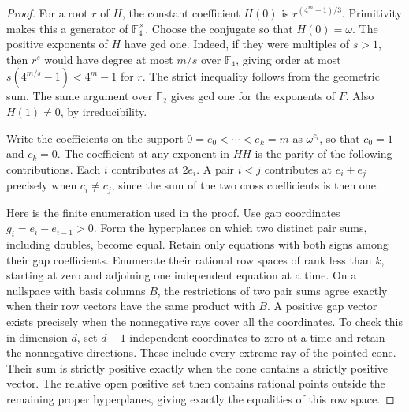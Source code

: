 \documentclass[11pt]{article}
\newcommand{\F}{\mathbb F_2}
\begin{document}
\begin{proof}
For a root \(r\) of \(H\), the constant coefficient \(H(0)\) is
\(r^{(4^m-1)/3}\). Primitivity makes this a generator of
\(\mathbb F_4^\times\). Choose the conjugate so that \(H(0)=\omega\).
The positive exponents of \(H\) have gcd one. Indeed, if they were
multiples of \(s>1\), then \(r^s\) would have degree at most \(m/s\)
over \(\mathbb F_4\), giving order at most \(s(4^{m/s}-1)<4^m-1\)
for \(r\). The strict inequality follows from the geometric sum.
The same argument over \(\F\) gives gcd one for the exponents of \(F\).
Also \(H(1)\ne0\), by irreducibility.

Write the coefficients on the support \(0=e_0<\cdots<e_k=m\) as
\(\omega^{c_i}\), so that \(c_0=1\) and \(c_k=0\). The coefficient
at any exponent in \(H\bar H\) is the parity of the following
contributions. Each \(i\) contributes at \(2e_i\). A pair \(i<j\)
contributes at \(e_i+e_j\) precisely when \(c_i\ne c_j\), since the
sum of the two cross coefficients is then one.

Here is the finite enumeration used in the proof. Use gap coordinates
\(g_i=e_i-e_{i-1}>0\). Form the hyperplanes on which two distinct
pair sums, including doubles, become equal. Retain only equations with
both signs among their gap coefficients. Enumerate their rational row
spaces of rank less than \(k\), starting at zero and adjoining one
independent equation at a time. On a nullspace with basis columns \(B\),
the restrictions of two pair sums agree exactly when their row vectors
have the same product with \(B\). A positive gap vector exists precisely
when the nonnegative rays cover all the coordinates. To check this in
dimension \(d\), set \(d-1\) independent coordinates to zero at a time
and retain the nonnegative directions. These include every extreme ray
of the pointed cone. Their sum is strictly positive exactly when the
cone contains a strictly positive vector. The relative open positive
set then contains rational points outside the remaining proper
hyperplanes, giving exactly the equalities of this row space.


\end{proof}
\end{document}
